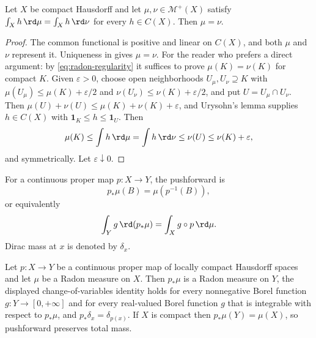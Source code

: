 \begin{corollary}\label{cor:riesz-uniqueness}
Let $X$ be compact Hausdorff and let $\mu,\nu\in\mathcal M^+(X)$ satisfy
$\int_Xh\,\rd\mu=\int_Xh\,\rd\nu$ for every $h\in C(X)$.  Then $\mu=\nu$.
\end{corollary}

\begin{proof}
The common functional is positive and linear on $C(X)$, and both $\mu$ and
$\nu$ represent it.  Uniqueness in  gives
$\mu=\nu$.  For the reader who prefers a direct argument: by
\eqref{eq:radon-regularity} it suffices to prove $\mu(K)=\nu(K)$ for compact
$K$.  Given $\varepsilon>0$, choose open neighborhoods
$U_\mu,U_\nu\supseteq K$ with
$\mu(U_\mu)\leq\mu(K)+\varepsilon/2$ and
$\nu(U_\nu)\leq\nu(K)+\varepsilon/2$, and put
$U=U_\mu\cap U_\nu$.  Then
$\mu(U)+\nu(U)\leq\mu(K)+\nu(K)+\varepsilon$, and Urysohn's lemma
supplies $h\in C(X)$ with $\mathbf 1_K\leq h\leq\mathbf 1_U$.  Then
\[
 \mu(K)\leq\int h\,\rd\mu=\int h\,\rd\nu\leq\nu(U)\leq\nu(K)+\varepsilon,
\]
and symmetrically.  Let $\varepsilon\downarrow0$.
\end{proof}

For a continuous proper map $p:X\to Y$, the pushforward is
\[
                       p_*\mu(B)=\mu(p^{-1}(B)),
\]
or equivalently
\[
                       \int_Y g\,\rd(p_*\mu)=\int_X g\circ p\,\rd \mu.
\]
Dirac mass at $x$ is denoted by $\delta_x$.

\begin{lemma}\label{lem:pushforward-radon}
Let $p:X\to Y$ be a continuous proper map of locally compact Hausdorff spaces
and let $\mu$ be a Radon measure on $X$.  Then $p_*\mu$ is a Radon measure on
$Y$, the displayed change-of-variables identity holds for every nonnegative
Borel function $g:Y\to[0,+\infty]$ and for every real-valued Borel function
$g$ that is integrable with respect to $p_*\mu$, and
$p_*\delta_x=\delta_{p(x)}$.  If $X$ is compact then
$p_*\mu(Y)=\mu(X)$, so pushforward preserves total mass.
\end{lemma}

